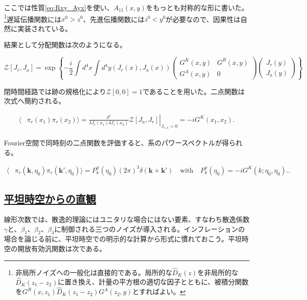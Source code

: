 \documentclass[a4paper,11pt]{ltjsarticle}
\newcommand{\subsectionlink}[1]{\subsection[#1]{\hyperlink{toc}{#1}}}
\numberwithin{equation}{section}
\def\pir{\pi_{r}}
\def\bfk{\textbf{k}}
\begin{document}
ここでは性質\eqref{eq:Rxy_Ayx}を使い、$A_{11}(x,y)$をもっとも対称的な形に書いた。\footnote{非局所ノイズへの一般化は直接的である。局所的な$\widehat D_K(z)$を非局所的な$\widehat D_K(z_1-z_2)$に置き換え、計量の平方根の適切な因子とともに、被積分関数を$G^R(x,z_1)\widehat D_K(z_1-z_2)G^A(z_2,y)$とすればよい。}遅延伝播関数には$x^0>z^0$、先進伝播関数には$z^0<y^0$が必要なので、因果性は自然に実装されている。

結果として分配関数は次のようになる。

\begin{equation}
\mathcal{Z}[J_{r},J_{a}]= \exp\left\{ - \frac{i}{2}\int d^{4}x \int d^{4}y \left(J_{r}(x),J_{a}(x)\right)\begin{pmatrix}
G^{K}(x,y) & G^{R}(x,y) \\ G^{A}(x,y) & 0
\end{pmatrix}\begin{pmatrix}
J_{r}(y) \\ J_{a}(y)
\end{pmatrix}\right\}
\end{equation}

閉時間経路では跡の規格化により$\mathcal{Z}[0,0]=1$であることを用いた\cite{kamenev_2011}。二点関数は次式へ簡約される。

\begin{align}\label{eq:extract}
\langle&\pir(x_{1})\pir(x_{2})\rangle=\left.\frac{\delta^{2}}{\delta J_{r}(x_{1})\delta J_{r}(x_{2})}\mathcal{Z}[J_{a},J_{r}]\right|_{J_{r,a}=0}=-i G^K(x_{1},x_{2}).
\end{align}

Fourier空間で同時刻の二点関数を評価すると、系のパワースペクトルが得られる。

\begin{align}
\langle&\pir(\bfk, \eta_{0})\pir(\bfk', \eta_{0})\rangle=P^\pi_{k}(\eta_{0})(2\pi)^{3}\delta(\bfk+\bfk') \quad \mathrm{with} \quad P^\pi_{k}(\eta_{0}) = -i G^K(k; \eta_0,\eta_0).\bigg.
\end{align}

\subsectionlink{平坦時空からの直観}\label{subsec:M4Pk}

線形次数では、散逸的理論にはユニタリな場合にはない要素、すなわち散逸係数$\gamma$と、$\beta_1$、$\beta_2$、$\beta_4$に制御される三つのノイズが導入される。インフレーションの場合を論じる前に、平坦時空での明示的な計算から形式に慣れておこう。平坦時空の開放有効汎関数は次である。
\end{document}
